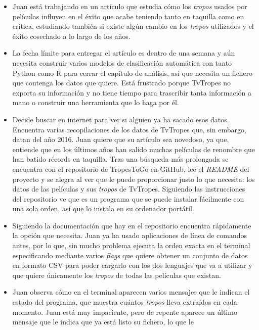 \begin{itemize}
    \item Juan está trabajando en un artículo que estudia cómo los
    \textit{tropos} usados por películas influyen en el éxito que acabe teniendo
    tanto en taquilla como en crítica, estudiando también si existe algún cambio
    en los \textit{tropos} utilizados y el éxito cosechado a lo largo de los
    años.
    \item La fecha límite para entregar el artículo es dentro de una semana y
    aún necesita construir varios modelos de clasificación automática con tanto
    Python como R para cerrar el capítulo de análisis, así que necesita un
    fichero que contenga los datos que quiere. Está frustrado porque TvTropes no
    exporta su información y no tiene tiempo para trascribir tanta información a
    mano o construir una herramienta que lo haga por él.
    \item Decide buscar en internet para ver si alguien ya ha sacado esos datos.
    Encuentra varias recopilaciones de los datos de TvTropes que, sin embargo,
    datan del año 2016. Juan quiere que su artículo sea novedoso, ya que,
    entiende que en los últimos años han salido muchas películas de renombre que
    han batido récords en taquilla. Tras una búsqueda más prolongada se
    encuentra con el repositorio de TropesToGo en GitHub, lee el \textit{README}
    del proyecto y se alegra al ver que le puede proporcionar justo lo que
    necesita: los datos de las películas y sus \textit{tropos} de TvTropes.
    Siguiendo las instrucciones del repositorio ve que es un programa que se
    puede instalar fácilmente con una sola orden, así que lo instala en su
    ordenador portátil.
    \item Siguiendo la documentación que hay en el repositorio encuentra
    rápidamente la opción que necesita. Juan ya ha usado aplicaciones de línea
    de comandos antes, por lo que, sin mucho problema ejecuta la orden exacta en
    el terminal especificando mediante varios \textit{flags} que quiere obtener
    un conjunto de datos en formato CSV para poder cargarlo con los dos
    lenguajes que va a utilizar y que quiere únicamente los \textit{tropos} de
    todas las películas que existan.
    \item Juan observa cómo en el terminal aparecen varios mensajes que le
    indican el estado del programa, que muestra cuántos \textit{tropos} lleva
    extraídos en cada momento. Juan está muy impaciente, pero de repente aparece
    un último mensaje que le indica que ya está listo su fichero, lo que le

\end{itemize}
